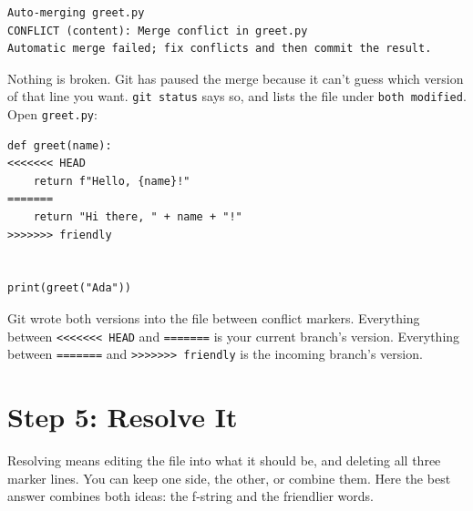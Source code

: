 \begin{codeblock}

\begin{Shaded}
\begin{Highlighting}[]
\end{Highlighting}
\end{Shaded}

\end{codeblock}

\begin{codeblock}
\begin{Verbatim}[formatcom=\outputstyle]
Auto-merging greet.py
CONFLICT (content): Merge conflict in greet.py
Automatic merge failed; fix conflicts and then commit the result.
\end{Verbatim}
\end{codeblock}


Nothing is broken. Git has paused the merge because it can't guess which version of that line you want. \texttt{git\ status} says so, and lists the file under \texttt{both\ modified}. Open \texttt{greet.py}:

\begin{codeblock}
\begin{Verbatim}[formatcom=\outputstyle]
def greet(name):
<<<<<<< HEAD
    return f"Hello, {name}!"
=======
    return "Hi there, " + name + "!"
>>>>>>> friendly


print(greet("Ada"))
\end{Verbatim}
\end{codeblock}

Git wrote both versions into the file between conflict markers. Everything between \texttt{\textless{}\textless{}\textless{}\textless{}\textless{}\textless{}\textless{}\ HEAD} and \texttt{=======} is your current branch's version. Everything between \texttt{=======} and \texttt{\textgreater{}\textgreater{}\textgreater{}\textgreater{}\textgreater{}\textgreater{}\textgreater{}\ friendly} is the incoming branch's version.

\section{Step 5: Resolve It}\label{10-lab-try-an-idea-without-breaking-anything:step-5-resolve-it}

Resolving means editing the file into what it should be, and deleting all three marker lines. You can keep one side, the other, or combine them. Here the best answer combines both ideas: the f-string and the friendlier words.

